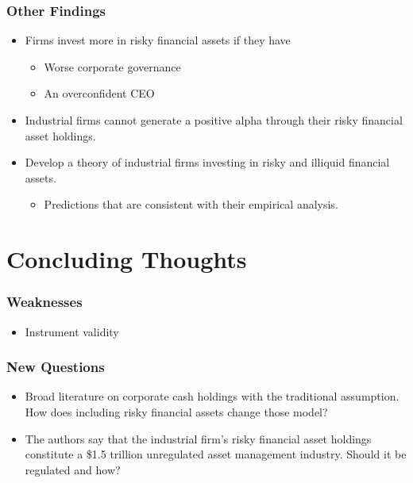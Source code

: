 \documentclass[handout]{beamer}
\begin{document}
\begin{frame}
\frametitle{Other Findings}
\begin{itemize}[<+->]
\item Firms invest more in risky financial assets if they have

\begin{itemize}[<+->]

\item Worse corporate governance

\item An overconfident CEO

\end{itemize}

\bigskip

\item Industrial firms cannot generate a positive alpha through their risky financial asset holdings.

\bigskip

\item Develop a theory of industrial firms investing in risky and illiquid financial assets.

\begin{itemize}
\item Predictions that are consistent with their empirical analysis.
\end{itemize}

\end{itemize}

\end{frame}


\section{Concluding Thoughts}




\begin{frame}
\frametitle{Weaknesses}
\begin{itemize}[<+->]
\item Instrument validity
\end{itemize}
\end{frame}


\begin{frame}
\frametitle{New Questions}
\begin{itemize}[<+->]
\item Broad literature on corporate cash holdings with the traditional assumption.  How does including risky financial assets change those model?
\item The authors say that the industrial firm's risky financial asset holdings constitute a \$1.5 trillion unregulated asset management industry. Should it be regulated and how?
\end{itemize}
\end{frame}
\end{document}

